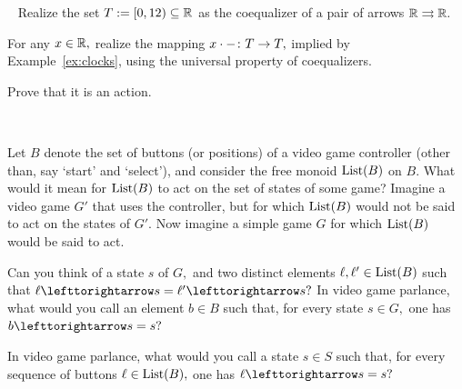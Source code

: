 \documentclass[CT4S-EN-RU]{subfiles}
\begin{document}
\begin{exampleRUS}\label{ex:clocks}
\end{exampleRUS}

\begin{exerciseENG}\label{exc:clock}~
\sexc Realize the set $T:=[0,12)\subseteq{\mathbb R}$ as the coequalizer of a pair of arrows ${\mathbb R}\rightrightarrows{\mathbb R}.$
\item For any $x\in{\mathbb R},$ realize the mapping $x\cdot-\colon T\rightarrow T,$ implied by Example~\ref{ex:clocks}, using the universal property of coequalizers.
\item Prove that it is an action.
\endsexc
\end{exerciseENG}

\begin{exerciseRUS}\label{exc:clock}~
\end{exerciseRUS}

\begin{exerciseENG}
Let $B$ denote the set of buttons (or positions) of a video game controller (other than, say `start' and `select'), and consider the free monoid $\operatorname{List}(B)$ on $B.$
\sexc What would it mean for $\operatorname{List}(B)$ to act on the set of states of some game? Imagine a video game $G'$ that uses the controller, but for which $\operatorname{List}(B)$ would not be said to act on the states of $G'.$ Now imagine a simple game $G$ for which $\operatorname{List}(B)$ would be said to act.
\item Can you think of a state $s$ of $G,$ and two distinct elements $\ell,\ell'\in\operatorname{List}(B)$ such that $\ell\acts s=\ell'\acts s?$ In video game parlance, what would you call an element $b\in B$ such that, for every state $s\in G,$ one has $b\acts s=s?$
\item In video game parlance, what would you call a state $s\in S$ such that, for every sequence of buttons $\ell\in\operatorname{List}(B),$ one has $\ell\acts s=s?$
\endsexc
\end{exerciseENG}

\begin{exerciseRUS}
\end{exerciseRUS}
\end{document}

